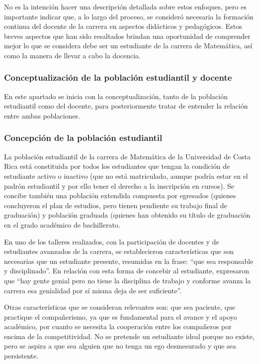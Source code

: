 No es la intención hacer una descripción detallada sobre estos enfoques, pero es importante indicar que, a lo largo del proceso, se consideró necesaria la formación continua del docente de la carrera en aspectos didácticos y pedagógicos. Estos breves aspectos que han sido resaltados brindan una oportunidad de comprender mejor lo que se considera debe ser un estudiante de la carrera de Matemática, así como la manera de llevar a cabo la docencia. 

\subsubsection{Conceptualización de la población estudiantil y docente}

En este apartado se inicia con la conceptualización, tanto de la población estudiantil como del docente, para posteriormente tratar de entender la relación entre ambas poblaciones.

\subsubsection*{Concepción de la población estudiantil}

La población estudiantil de la carrera de Matemática de la Universidad de Costa Rica está constituida por todos los estudiantes que tengan la condición de estudiante activo o inactivo (que no está matriculado, aunque podría estar en el padrón estudiantil y por ello tener el derecho a la inscripción en cursos). Se concibe también una población extendida compuesta por egresados (quienes concluyeron el plan de estudios, pero tienen pendiente su trabajo final de graduación) y población graduada (quienes han obtenido su título de graduación en el grado académico de bachillerato. 

En uno de los talleres realizados, con la participación de docentes y de estudiantes avanzados de la carrera, se establecieron características que son necesarias que un estudiante presente, resumidas en la frase: “que sea responsable y disciplinado”. En relación con esta forma de concebir al estudiante, expresaron que “hay gente genial pero no tiene la disciplina de trabajo y conforme avanza la carrera esa genialidad por sí misma deja de ser suficiente”.

Otras características que se consideran relevantes son: que sea paciente, que practique el compañerismo, ya que es fundamental para el avance y el apoyo académico, por cuanto se necesita la cooperación entre los compañeros por encima de la competitividad. No se pretende un estudiante ideal porque no existe, pero se aspira a que sea alguien que no tenga un ego desmesurado y que sea persistente.

